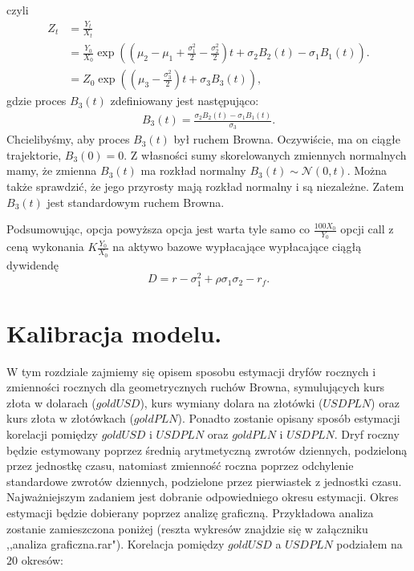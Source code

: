 \documentclass[12pt]{article}
\begin{document}
czyli 
\begin{align*}
    Z_t &= \tfrac{Y_t}{X_t} \\
        &= \tfrac{Y_0}{X_0} \exp \left( (\mu_2 - \mu_1 +  \tfrac{\sigma_1^2}{2} - \tfrac{\sigma_2^2}{2})t + \sigma_2 B_2(t) - \sigma_1 B_1(t) \right). \\
        &= Z_0 \exp \left ( (\mu_3 - \tfrac{\sigma_3^2}{2})t + \sigma_3 B_3(t)\right),
\end{align*}
gdzie proces $B_3(t)$ zdefiniowany jest następująco: 
\begin{align*}
    B_3(t) = \frac{\sigma_2 B_2(t) - \sigma_1 B_1(t)}{\sigma_3}.
\end{align*}
Chcielibyśmy, aby proces $B_3(t)$ był ruchem Browna. Oczywiście, ma on ciągłe trajektorie, $B_3(0) = 0$. Z własności sumy skorelowanych zmiennych normalnych mamy, że zmienna $B_3(t)$ ma rozkład normalny $ B_3(t) \sim \mathcal{N}(0, t).$ Można także sprawdzić, że jego przyrosty mają rozkład normalny i są niezależne. Zatem $B_3(t)$ jest standardowym ruchem Browna.
\newline

 Podsumowując, opcja powyższa opcja jest warta tyle samo co $\tfrac{100 X_0}{Y_0}$ opcji call z ceną wykonania $K\tfrac{Y_0}{X_0}$ na aktywo bazowe wypłacające wypłacające ciągłą dywidendę 
 $$ D = r - \sigma_1^2 + \rho \sigma_1 \sigma_2 - r_f.$$
 \newline

\section{Kalibracja modelu.}
\label{Kalibracja}
W tym rozdziale zajmiemy się opisem sposobu estymacji dryfów rocznych i zmienności rocznych dla geometrycznych ruchów Browna, symulujących kurs złota w dolarach ($goldUSD$), kurs wymiany dolara na złotówki ($USDPLN$) oraz kurs złota w złotówkach ($goldPLN$). Ponadto zostanie opisany sposób estymacji korelacji pomiędzy $goldUSD$ i $USDPLN$ oraz $goldPLN$ i $USDPLN$. 
\newline
Dryf roczny będzie estymowany poprzez średnią arytmetyczną zwrotów dziennych, podzieloną przez jednostkę czasu, natomiast zmienność roczna poprzez odchylenie standardowe zwrotów dziennych, podzielone przez pierwiastek z jednostki czasu. Najważniejszym zadaniem jest dobranie odpowiedniego okresu estymacji. Okres estymacji będzie dobierany poprzez analizę graficzną. 
Przykładowa analiza zostanie zamieszczona poniżej (reszta wykresów znajdzie się w załączniku ,,analiza graficzna.rar").
Korelacja pomiędzy $goldUSD$ a $USDPLN$ podziałem na $20$ okresów:
\newpage
\end{document}
